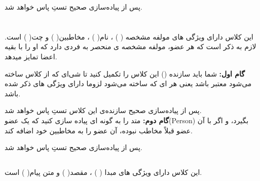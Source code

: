     پس از پیاده‌سازی صحیح تستِ 
    \grayBox{\textcolor{dkgreen}{StoreMostPopularTest}}
    پاس خواهد شد.
\LTR


\RTL
\newpage
    \section{
        \grayBox{\textcolor{purple}{Telegram}}
        \grayBox{\textcolor{blue}{}}
    }
    \RTL
 
    \subsection{ }
    
    این کلاس دارای ویژگی های 
    مولفه مشخصه (
    \grayBox{\textcolor{navyBlue}{ID}}
    )
    ، 
    نام(
    \grayBox{\textcolor{navyBlue}{Name}}
    )
    ،
    مخاطبین(
    \grayBox{\textcolor{navyBlue}{Contacts}}
    )
    و 
    چت(
    \grayBox{\textcolor{navyBlue}{Chats}}
    ) است.
    لازم به ذکر است که هر عضو، مولفه مشخصه ی منحصر به فردی دارد که او را با بقیه اعضا تمایز میدهد.
    
    \RTL
    
    
    \textbf{گام اول: }
    شما باید سازنده
    (\grayBox{\textcolor{navyBlue}{constructor}}) 
    این کلاس را تکمیل کنید تا شی‌ای که از کلاس ساخته می‌شود معتبر باشد یعنی هر 
    \grayBox{\textcolor{navyBlue}{Person}}ای 
    که ساخته می‌شود لزوما دارای ویژگی های ذکر شده باشد.
    
    پس از پیاده‌سازی صحیح سازنده‌ی این کلاس تستِ 
    \grayBox{\textcolor{dkgreen}{test\_PersonConstructor}}
    پاس خواهد شد.
    \\
    \textbf{گام دوم: }
    متد 
    \grayBox{\textcolor{navyBlue}{AddContact}}
    را به گونه ای پیاده سازی کنید که 
    یک عضو(Person) بگیرد،
    و  اگر با آن عضو قبلاً مخاطب نبوده، آن عضو را به مخاطبین خود اضافه کند.
    
    
    پس از پیاده‌سازی صحیح تستِ 
    \grayBox{\textcolor{dkgreen}{test\_PersonAddContact}}
    پاس خواهد شد.
    
    \RTL
 
    \subsection{ }
    
    این کلاس دارای ویژگی های 
    مبدا (
    \grayBox{\textcolor{navyBlue}{Source}}
    )
    ، 
    مقصد(
    \grayBox{\textcolor{navyBlue}{Destination}}
    )
    و
    متن پیام(
    \grayBox{\textcolor{navyBlue}{Context}}
    )
    است.
    

